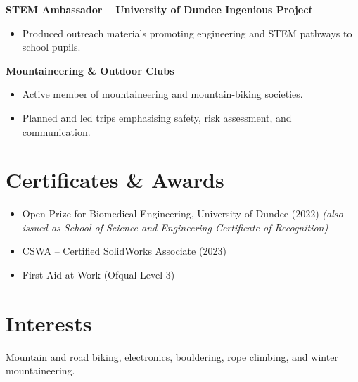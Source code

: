 \documentclass[a4paper,11pt]{article}
\begin{document}
\textbf{STEM Ambassador – University of Dundee Ingenious Project}
\begin{itemize}
    \item Produced outreach materials promoting engineering and STEM pathways to school pupils.
\end{itemize}

\textbf{Mountaineering \& Outdoor Clubs}
\begin{itemize}
    \item Active member of mountaineering and mountain-biking societies.
    \item Planned and led trips emphasising safety, risk assessment, and communication.
\end{itemize}

\section*{Certificates \& Awards}
\begin{itemize}
    \item Open Prize for Biomedical Engineering, University of Dundee (2022) \textit{(also issued as School of Science and Engineering Certificate of Recognition)}
    \item CSWA – Certified SolidWorks Associate (2023)
    \item First Aid at Work (Ofqual Level 3)
\end{itemize}

\section*{Interests}
Mountain and road biking, electronics, bouldering, rope climbing, and winter mountaineering.
\end{document}
